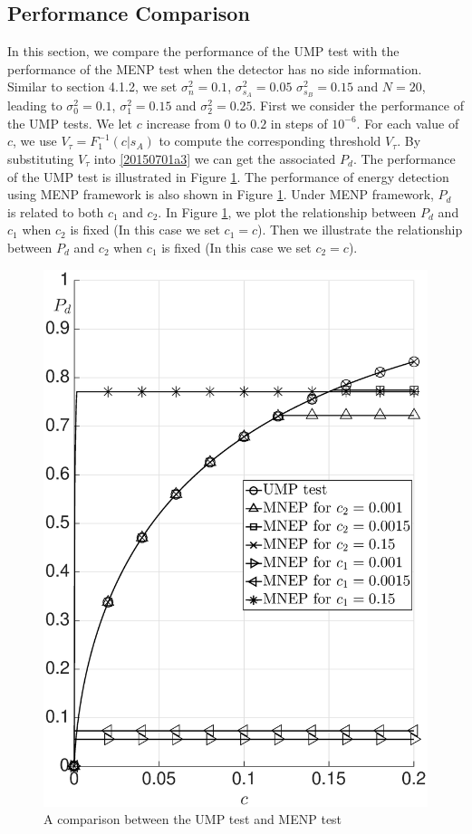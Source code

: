\subsection{Performance Comparison}
In this section, we compare the performance of the UMP test with the performance of the MENP test when the detector has no side information.
Similar to section 4.1.2, we set $\sigma_n^2= 0.1$, $\sigma_{s_A}^2 = 0.05$ $\sigma_{s_B}^2 = 0.15$ and $N=20$, leading to  $\sigma_0^2 = 0.1$, $\sigma_1^2=0.15$ and $\sigma_2^2 = 0.25$. 
First we consider the performance of the UMP tests. 
We let $c$ increase from $0$ to $0.2$ in steps of $10^{-6}$. For each value of $c$, we use $V_\tau = F_1^{-1}(c|s_A)$ to compute the corresponding threshold $V_\tau$. By substituting $V_\tau$ into \eqref{20150701a3} we can get the associated $P_d$. The performance of the UMP test is illustrated in Figure \ref{pic:20150701a0}. 
The performance of energy detection using MENP framework is also shown in Figure \ref{pic:20150701a0}. Under MENP framework, $P_d$ is related to both $c_1$ and $c_2$. In Figure \ref{pic:20150701a0}, we plot the relationship between $P_d$ and $c_1$ when $c_2$ is fixed (In this case we set $c_1 = c$). Then we illustrate the relationship between $P_d$ and $c_2$ when $c_1$ is fixed (In this case we set $c_2 = c$).   

\begin{figure}[!hbp]
\centering
\includegraphics[width = 14cm]{5/noSI.eps}
\caption{A comparison between the UMP test and MENP test}
\label{pic:20150701a0}
\end{figure}

